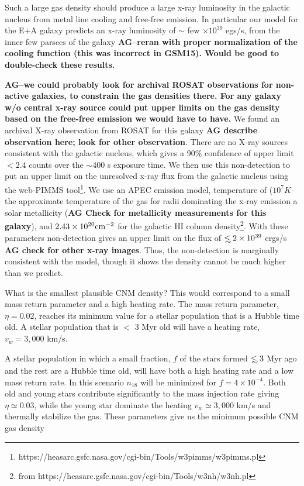 \documentclass[usenatbib,fleqn]{mnras}
\newcommand\lsim{\mathrel{\rlap{\lower4pt\hbox{\hskip1pt$\sim$}}
    \raise1pt\hbox{$<$}}}
\begin{document}
Such a large gas density should produce a large x-ray luminosity in
the galactic nucleus from metal line cooling and free-free emission.
In particular our model for the E+A galaxy predicts an x-ray
luminosity of $\sim$ few $\times 10^{39}$ egs/s, from the inner few
parsecs of the galaxy {\bf AG--reran with proper normalization of the
  cooling function (this was incorrect in GSM15). Would be good to
  double-check these results.}


{\bf AG--we could probably look for archival ROSAT observations for
  non-active galaxies, to constrain the gas densities
  there. For any galaxy w/o central x-ray source could put upper
  limits on the gas density based on the free-free emission we would
  have to have.}
We found an archival X-ray observation from ROSAT for this galaxy {\bf
  AG describe observation here; look for other observation}. There are
no X-ray sources consistent with the galactic nucleus, which gives a
90\% confidence of upper limit $<2.4$ counts over the $\sim$400 s
exposure time. We then use this non-detection to put an upper limit on
the unresolved x-ray flux from the galactic nucleus using the
web-PIMMS
tool\footnote{https://heasarc.gsfc.nasa.gov/cgi-bin/Tools/w3pimms/w3pimms.pl}. We
use an APEC emission model, temperature of ($10^{7} K$--the
approximate temperature of the gas for radii dominating the x-ray
emission a solar metallicity ({\bf AG Check for metallicity
  measurements for this galaxy}), and $2.43\times 10^{20} {\rm
  cm^{-2}}$ for the galactic HI column density\footnote{from
  https://heasarc.gsfc.nasa.gov/cgi-bin/Tools/w3nh/w3nh.pl}. With
these parameters non-detection gives an upper limit on the flux of
$\lsim 2\times 10^{39}$ ergs/s {\bf AG check for other x-ray
  images}. Thus, the non-detection is marginally consistent with the
model, though it shows the density cannot be much higher than we
predict.

What is the smallest plausible CNM density? This would correspond to a
small mass return parameter and a high heating rate. The mass return
parameter, $\eta=0.02$, reaches its minimum value for a stellar
population that is a Hubble time old. A stellar population
that is $<$ 3 Myr old will have a heating rate, $v_w=3,000$ km/s.

A stellar population in which a small fraction, $f$ of the stars
formed $\lsim 3$ Myr ago and the rest are a Hubble time old, will have
both a high heating rate and a low mass return rate. In this scenario
$n_{18}$ will be minimized for $f=4\times 10^{-4}$. Both old and young
stars contribute significantly to the mass injection rate giving
$\eta\simeq 0.03$, while the young star dominate the heating
$v_w\simeq 3,000$ km/s and thermally stabilize the gas. These
parameters give us the minimum possible CNM gas density
\end{document}
